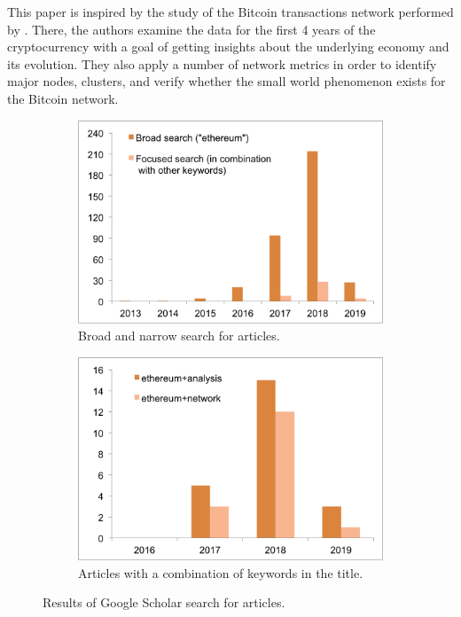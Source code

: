 This paper is inspired by the study of the Bitcoin transactions network performed by \cite{lischke2016analyzing}.
There, the authors examine the data for the first 4 years of the cryptocurrency with a goal of getting insights about the underlying economy and its evolution.
They also apply a number of network metrics in order to identify major nodes, clusters, and verify whether the small world phenomenon exists for the Bitcoin network.

\begin{figure}[ht]
  \centering
  \begin{subfigure}[b]{0.49\linewidth}
    \includegraphics[width=\linewidth]{figures/search.png}
    \caption{Broad and narrow search for articles.}
    \label{fig:search_types}
  \end{subfigure}
  \begin{subfigure}[b]{0.49\linewidth}
    \includegraphics[width=\linewidth]{figures/narrow_search.png}
    \caption{Articles with a combination of keywords in the title.}
    \label{fig:narrow_search}
  \end{subfigure}
  \caption{Results of Google Scholar search for articles.}
  \label{fig:search}
\end{figure}

